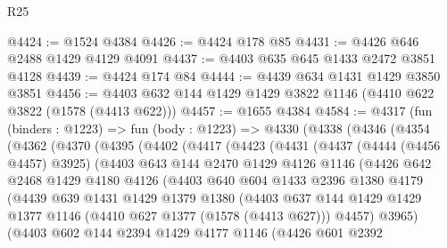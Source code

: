 \begin{lexlean}{R25}
\begin{coremodule}
@4424 := @1524 @4384
@4426 := @4424 @178 @85
@4431 := @4426 @646 @2488 @1429 @4129 @4091
@4437 := @4403 @635 @645 @1433 @2472 @3851 @4128
@4439 := @4424 @174 @84
@4444 := @4439 @634 @1431 @1429 @3850 @3851
@4456 := @4403 @632 @144 @1429 @1429 @3822 @1146 (@4410 @622 @3822 (@1578 (@4413 @622)))
@4457 := @1655 @4384
@4584 := @4317
    (fun (binders : @1223) =>
    fun (body : @1223) =>
    @4330
      (@4338
        (@4346
          (@4354
            (@4362
              (@4370
                (@4395
                  (@4402
                    (@4417
                      (@4423
                        (@4431
                          (@4437
                            (@4444 (@4456 @4457) @3925)
                            (@4403
                              @643
                              @144
                              @2470
                              @1429
                              @4126
                              @1146
                              (@4426
                                @642
                                @2468
                                @1429
                                @4180
                                @4126
                                (@4403
                                  @640
                                  @604
                                  @1433
                                  @2396
                                  @1380
                                  @4179
                                  (@4439
                                    @639
                                    @1431
                                    @1429
                                    @1379
                                    @1380
                                    (@4403
                                      @637
                                      @144
                                      @1429
                                      @1429
                                      @1377
                                      @1146
                                      (@4410 @627 @1377 (@1578 (@4413 @627)))
                                      @4457)
                                    @3965)
                                  (@4403
                                    @602
                                    @144
                                    @2394
                                    @1429
                                    @4177
                                    @1146
                                    (@4426
                                      @601
                                      @2392

\end{coremodule}
\end{lexlean}
